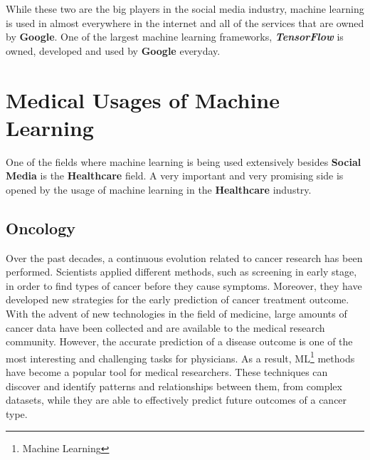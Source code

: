 While these two are the big players in the social media industry, machine learning is used in almost everywhere in the internet and all of the services that are owned by \textbf{Google}. One of the largest machine learning frameworks, \textbf{\textit{TensorFlow}} is owned, developed and used by \textbf{Google} everyday.
\section{Medical Usages of Machine Learning}
One of the fields where machine learning is being used extensively besides \textbf{Social Media} is the \textbf{Healthcare} field. A very important and very promising side is opened by the usage of machine learning in the \textbf{Healthcare} industry.
\subsection{Oncology}
Over the past decades, a continuous evolution related to cancer research has been performed\cite{hanhen11}. Scientists applied different methods, such as screening in early stage, in order to find types of cancer before they cause symptoms. Moreover, they have developed new strategies for the early prediction of cancer treatment outcome. With the advent of new technologies in the field of medicine, large amounts of cancer data have been collected and are available to the medical research community. However, the accurate prediction of a disease outcome is one of the most interesting and challenging tasks for physicians. As a result, ML\footnote{Machine Learning} methods have become a popular tool for medical researchers\cite{cicchetti92}. These techniques can discover and identify patterns and relationships between them, from complex datasets, while they are able to effectively predict future outcomes of a cancer type.
